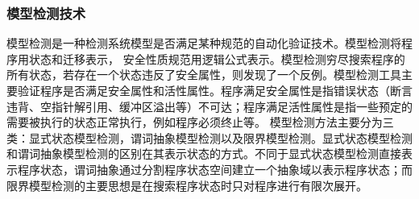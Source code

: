 %
%
%
%

\subsubsection{模型检测技术}

模型检测是一种检测系统模型是否满足某种规范的自动化验证技术。模型检测将程序用状态和迁移表示，
安全性质规范用逻辑公式表示。模型检测穷尽搜索程序的所有状态，若存在一个状态违反了安全属性，则发现了一个反例。模型检测工具主要验证程序是否满足安全属性和活性属性。程序满足安全属性是指错误状态（断言违背、空指针解引用、缓冲区溢出等）不可达；程序满足活性属性是指一些预定的需要被执行的状态正常执行，例如程序必须终止等。
模型检测方法主要分为三类：显式状态模型检测，谓词抽象模型检测以及限界模型检测。显式状态模型检测和谓词抽象模型检测的区别在其表示状态的方式。不同于显式状态模型检测直接表示程序状态，谓词抽象通过分割程序状态空间建立一个抽象域以表示程序状态；而限界模型检测的主要思想是在搜索程序状态时只对程序进行有限次展开。

